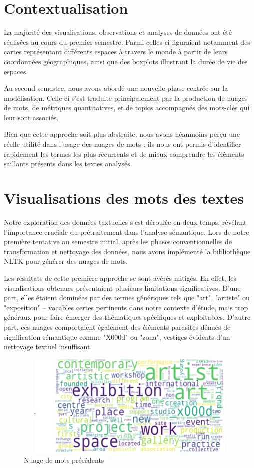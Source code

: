 \documentclass[mstat,12pt]{unswthesis}
\begin{document}
\hypertarget{Contextualisation}{%
\section{Contextualisation}\label{Contextualisation}}

La majorité des visualisations, observations et analyses de données ont été réalisées au cours du premier semestre. Parmi celles-ci figuraient notamment des cartes représentant différents espaces à travers le monde à partir de leurs coordonnées géographiques, ainsi que des boxplots illustrant la durée de vie des espaces.

Au second semestre, nous avons abordé une nouvelle phase centrée sur la modélisation. Celle-ci s’est traduite principalement par la production de nuages de mots, de métriques quantitatives, et de topics accompagnés des mots-clés qui leur sont associés.

Bien que cette approche soit plus abstraite, nous avons néanmoins perçu une réelle utilité dans l’usage des nuages de mots : ils nous ont permis d’identifier rapidement les termes les plus récurrents et de mieux comprendre les éléments saillants présents dans les textes analysés.

\hypertarget{Visualisations des mots des textes}{%
\section{Visualisations des mots des textes}\label{Visualisations des mots des textes}}
Notre exploration des données textuelles s'est déroulée en deux temps, révélant l'importance cruciale du prétraitement dans l'analyse sémantique. Lors de notre première tentative au semestre initial, après les phases conventionnelles de transformation et nettoyage des données, nous avons implémenté la bibliothèque NLTK pour générer des nuages de mots.

Les résultats de cette première approche se sont avérés mitigés. En effet, les visualisations obtenues présentaient plusieurs limitations significatives. D'une part, elles étaient dominées par des termes génériques tels que "art", "artiste" ou "exposition" – vocables certes pertinents dans notre contexte d'étude, mais trop généraux pour faire émerger des thématiques spécifiques et exploitables. D'autre part, ces nuages comportaient également des éléments parasites dénués de signification sémantique comme "X000d" ou "zona", vestiges évidents d'un nettoyage textuel insuffisant.

\begin{figure}[H]
    \centering
    \includegraphics[width=13cm,height=5cm]{ancien_nuage_mots.png}
    \caption{Nuage de mots précédents}
    \label{fig:enquete}
\end{figure}
\end{document}
